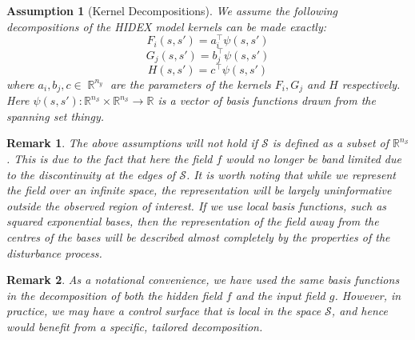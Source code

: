 \documentclass{IEEEtran}
\DeclareMathOperator{\R}{\mathbb{R}}
\DeclareMathOperator{\onto}{\rightarrow}
\newtheorem{remark}{Remark}
\newtheorem{assumption}{Assumption}
\begin{document}
\begin{assumption}[Kernel Decompositions]
	\label{ass:kerndecomp}
	We assume the following decompositions of the HIDEX model kernels can be made exactly:
	\begin{equation}
	F_i(s,s') = a_i^\top\psi(s,s')
\end{equation}
\begin{equation}
	G_j(s,s') = b_j^\top\psi(s,s')
\end{equation}
\begin{equation}
	H(s,s') = c^\top\psi(s,s')
\end{equation}
where $a_i, b_j, c \in \R^{n_y}$ are the parameters of the kernels $F_i, G_j$ and $H$ respectively. Here $\psi(s,s') : \mathbb{R}^{n_\mathcal{S}} \times \mathbb{R}^{n_\mathcal{S}} \onto \mathbb{R}$ is a vector of basis functions drawn from the spanning set thingy.
\end{assumption}

\begin{remark}
	The above assumptions will not hold if $\mathcal{S}$ is defined as a subset of $\mathbb{R}^{n_\mathcal{S}}$. This is due to the fact that here the field $f$ would no longer be band limited due to the discontinuity at the edges of $\mathcal{S}$. It is worth noting that while we represent the field over an infinite space, the representation will be largely uninformative outside the observed region of interest. If we use local basis functions, such as squared exponential bases, then the representation of the field away from the centres of the bases will be described almost completely by the properties of the disturbance process.
\end{remark}

\begin{remark}
As a notational convenience, we have used the same basis functions in the decomposition of both the hidden field $f$ and the input field $g$. However, in practice, we may have a control surface that is local in the space $\mathcal{S}$, and hence would benefit from a specific, tailored decomposition. 
\end{remark}
\end{document}
